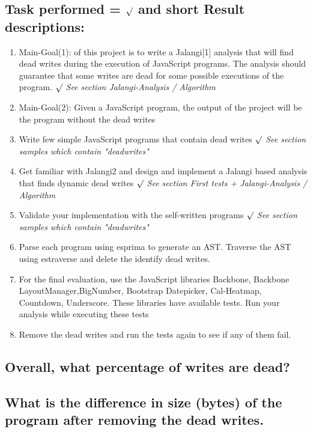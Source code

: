 \documentclass[a4paper]{scrartcl}
\begin{document}
\subsection{Task performed = $\surd$ and short Result descriptions:}
\begin{enumerate}
\item Main-Goal(1): of this project is to write a Jalangi[1] analysis that will find dead writes during the execution of JavaScript programs. The analysis should guarantee that some writes are dead for some possible executions of the program. $\surd$ \newline \textit{See section Jalangi-Analysis / Algorithm}
\item Main-Goal(2): Given a JavaScript program, the output of the project will be the program without the dead writes 
\item Write few simple JavaScript programs that contain dead writes  $\surd$ \newline \textit{See section samples which contain "deadwrites"}
\item Get familiar with Jalangi2 and design and implement a Jalangi based analysis that finds dynamic dead writes  $\surd$ \textit{See section First tests + Jalangi-Analysis / Algorithm}
\item Validate your implementation with the self-written programs  $\surd$ \newline \textit{See section samples which contain "deadwrites"}
\item Parse each program using esprima to generate an AST. Traverse the AST using estraverse and delete the identify dead writes. 
\item For the final evaluation, use the JavaScript libraries Backbone, Backbone LayoutManager,BigNumber, Bootstrap Datepicker, Cal-Heatmap, Countdown,
Underscore. These libraries have available tests. Run your analysis while executing these tests 
\item Remove the dead writes and run the tests again to see if any of them fail.
\end{enumerate}
\subsection{Overall, what percentage of writes are dead?}
\subsection{What is the difference in size (bytes) of the program after removing the dead writes.}
\end{document}
